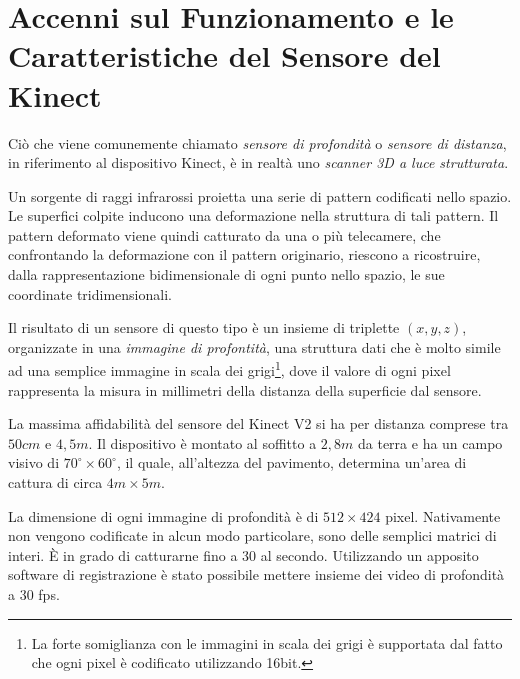 
\chapter{Accenni sul Funzionamento e le Caratteristiche del Sensore del Kinect} %
\label{cha:kinect}

Ciò che viene comunemente chiamato \emph{sensore di profondità} o \emph{sensore di distanza}, in riferimento al dispositivo Kinect, è in realtà uno \emph{scanner 3D a luce strutturata}.

Un sorgente di raggi infrarossi proietta una serie di pattern codificati nello spazio.
Le superfici colpite inducono una deformazione nella struttura di tali pattern.
Il pattern deformato viene quindi catturato da una o più telecamere, che confrontando la deformazione con il pattern originario, riescono a ricostruire, dalla rappresentazione bidimensionale di ogni punto nello spazio, le sue coordinate tridimensionali.

Il risultato di un sensore di questo tipo è un insieme di triplette $(x,y,z)$, organizzate in una \emph{immagine di profontità}, una struttura dati che è molto simile ad una semplice immagine in scala dei grigi\footnote{La forte somiglianza con le immagini in scala dei grigi è supportata dal fatto che ogni pixel è codificato utilizzando 16bit.}, dove il valore di ogni pixel rappresenta la misura in millimetri della distanza della superficie dal sensore.

La massima affidabilità del sensore del Kinect V2 si ha per distanza comprese tra $50cm$ e $4,5m$.
Il dispositivo è montato al soffitto a $2,8m$ da terra e ha un campo visivo di $70^{\circ} \times 60^{\circ}$, il quale, all'altezza del pavimento, determina un'area di cattura di circa $4m \times 5m$.

La dimensione di ogni immagine di profondità è di $512 \times 424$ pixel. 
Nativamente non vengono codificate in alcun modo particolare, sono delle semplici matrici di interi.
È in grado di catturarne fino a 30 al secondo. 
Utilizzando un apposito software di registrazione è stato possibile mettere insieme dei video di profondità a 30 fps.

